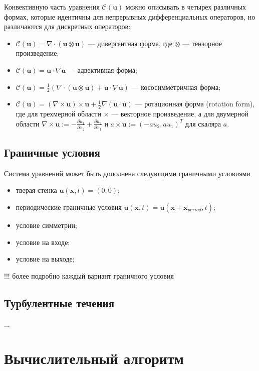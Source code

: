 \documentclass[a4paper,10pt]{report}
\begin{document}
Конвективную часть уравнения $\mathcal{C}(\bm{u})$ можно описывать в четырех различных формах, которые идентичны для непрерывных дифференциальных операторов, но различаются для дискретных операторов:
\begin{itemize}
\item $\mathcal{C}(\bm{u}) = \nabla \cdot \left(\bm{u} \otimes \bm{u} \right)$ --- дивергентная форма, где $\otimes$ --- тензорное произведение;
\item $\mathcal{C}(\bm{u}) = \bm{u} \cdot \nabla \bm{u}$ --- адвективная форма;
\item $\mathcal{C}(\bm{u}) = \frac{1}{2}\left(\nabla \cdot \left(\bm{u} \otimes \bm{u} \right) + \bm{u} \cdot \nabla \bm{u} \right)$ --- кососимметричная форма;
\item $\mathcal{C}(\bm{u}) = \left( \nabla \times \bm{u} \right) \times \bm{u} + \frac{1}{2} \nabla \left(\bm{u} \cdot \bm{u} \right) $ --- ротационная форма (rotation form), где для трехмерной области $\times$ --- векторное произведение, а для двумерной области $\nabla \times \bm{u} := -\frac{\partial u_1}{\partial x_2} + \frac{\partial u_2}{\partial x_1}$ и $a \times \bm{u} := (-a u_2, a u_1)^T$ для скаляра $a$.
\end{itemize}

\subsection{Граничные условия}
Система уравнений может быть дополнена следующими граничными условиями
\begin{itemize}
\item тверая стенка $\bm{u}(\bm{x}, t) = (0, 0)$;
\item периодические граничные условия $\bm{u}(\bm{x}, t) = \bm{u}(\bm{x} + \bm{x}_{period}, t)$;
\item условие симметрии;
\item условие на входе;
\item условие на выходе;
\end{itemize}

!!! более подробно каждый вариант граничного условия

\subsection{Турбулентные течения}
...

\section{Вычислительный алгоритм}
\end{document}
